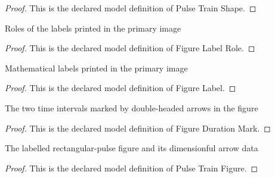 \begin{proof}
  This is the declared model definition of Pulse Train Shape.
\end{proof}
\begin{definition}
  \label{def:physics:phyx-mini-0504:phyxminiproblems-problemphyxmini0504-figurelabelrole}
  Roles of the labels printed in the primary image
\end{definition}
\begin{proof}
  This is the declared model definition of Figure Label Role.
\end{proof}
\begin{definition}
  \label{def:physics:phyx-mini-0504:phyxminiproblems-problemphyxmini0504-figurelabel}
  Mathematical labels printed in the primary image
\end{definition}
\begin{proof}
  This is the declared model definition of Figure Label.
\end{proof}
\begin{definition}
  \label{def:physics:phyx-mini-0504:phyxminiproblems-problemphyxmini0504-figuredurationmark}
  The two time intervals marked by double-headed arrows in the figure
\end{definition}
\begin{proof}
  This is the declared model definition of Figure Duration Mark.
\end{proof}
\begin{definition}
  \label{def:physics:phyx-mini-0504:phyxminiproblems-problemphyxmini0504-pulsetrainfigure}
  The labelled rectangular-pulse figure and its dimensionful arrow data
\end{definition}
\begin{proof}
  This is the declared model definition of Pulse Train Figure.
\end{proof}
